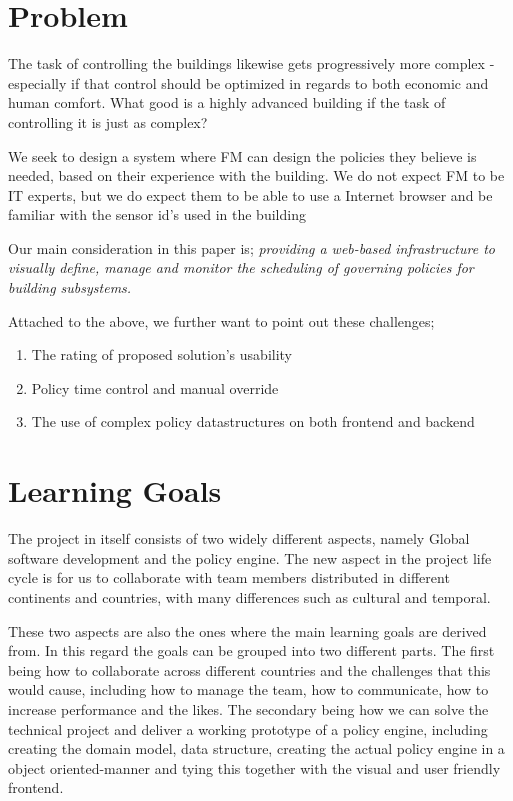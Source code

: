\section{Problem} \label{sec:problem}
The task of controlling the buildings likewise gets progressively more complex - especially if that control should be optimized in regards to both economic and human comfort. What good is a highly advanced building if the task of controlling it is just as complex?

We seek to design a system where FM can design the policies they believe is needed, based on their experience with the building. We do not expect FM to be IT experts, but we do expect them to be able to use a Internet browser and be familiar with the sensor id's used in the building

Our main consideration in this paper is; \textit{providing a web-based infrastructure to visually define, manage and monitor the scheduling of governing policies for building subsystems.}

Attached to the above, we further want to point out these challenges;
\begin{enumerate}
	\item The rating of proposed solution's usability
	\item Policy time control and manual override
	\item The use of complex policy datastructures on both frontend and backend
\end{enumerate}

\section{Learning Goals} \label{sec:learninggoals}
The project in itself consists of two widely different aspects, namely Global software development and the policy engine. The new aspect in the project life cycle is for us to collaborate with team members distributed in different continents and countries, with many differences such as cultural and temporal.

These two aspects are also the ones where the main learning goals are derived from. In this regard the goals can be grouped into two different parts. The first being how to collaborate across different countries and the challenges that this would cause, including how to manage the team, how to communicate, how to increase performance and the likes. The secondary being how we can solve the technical project and deliver a working prototype of a policy engine, including creating the domain model, data structure, creating the actual policy engine in a object oriented-manner and tying this together with the visual and user friendly frontend.

